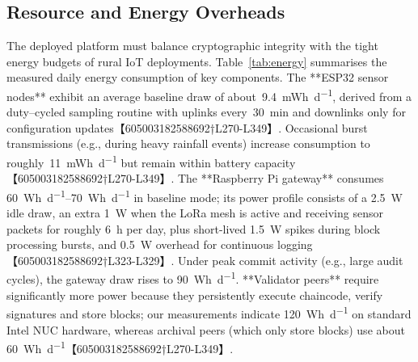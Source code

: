 

\subsection{Resource and Energy Overheads}
\label{sec:energy_overheads}

The deployed platform must balance cryptographic integrity with the tight energy budgets of rural IoT deployments.  Table~\ref{tab:energy} summarises the measured daily energy consumption of key components.  The **ESP32 sensor nodes** exhibit an average baseline draw of about~\SI{9.4}{mWh\per\day}, derived from a duty–cycled sampling routine with uplinks every\ \SI{30}{min} and downlinks only for configuration updates【605003182588692†L270-L349】.  Occasional burst transmissions (e.g., during heavy rainfall events) increase consumption to roughly~\SI{11}{mWh\per\day} but remain within battery capacity【605003182588692†L270-L349】.  The **Raspberry Pi gateway** consumes \SIrange{60}{70}{Wh\per\day} in baseline mode; its power profile consists of a \SI{2.5}{W} idle draw, an extra \SI{1}{W} when the LoRa mesh is active and receiving sensor packets for roughly \SI{6}{h} per day, plus short-lived \SI{1.5}{W} spikes during block processing bursts, and \SI{0.5}{W} overhead for continuous logging【605003182588692†L323-L329】.  Under peak commit activity (e.g., large audit cycles), the gateway draw rises to \SI{90}{Wh\per\day}.  **Validator peers** require significantly more power because they persistently execute chaincode, verify signatures and store blocks; our measurements indicate \SI{120}{Wh\per\day} on standard Intel NUC hardware, whereas archival peers (which only store blocks) use about \SI{60}{Wh\per\day}【605003182588692†L270-L349】.

